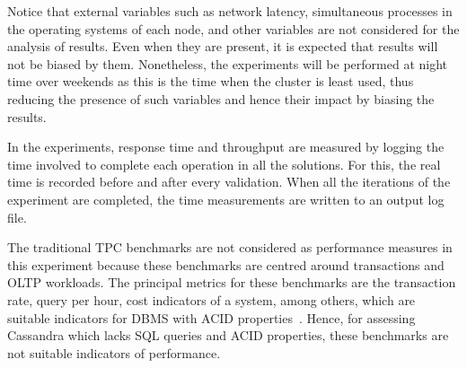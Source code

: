 Notice that external variables such as network latency,  simultaneous processes
in the operating systems of each node,  and other variables are not considered
for the analysis of results.  Even when they are present,  it is expected that
results will not be biased by them.  Nonetheless,  the experiments will be
performed at night time over weekends as this is the time when the cluster is
least used,  thus reducing the presence of such variables and hence their impact
by biasing the results. 

In the experiments,  response time and throughput are measured by logging the
time involved to complete each operation in all the solutions. 
For this,  the  real time is recorded before and after every validation.  When all
the iterations of the experiment are completed,  the time
measurements are written to an output log file. 

The traditional TPC benchmarks are not considered as performance measures in
this experiment  because these benchmarks are centred around transactions and
OLTP workloads.  The principal metrics for these benchmarks are the transaction
rate,  query per hour,  cost indicators of a system,  among others,  which are
suitable indicators for \ac{DBMS} with ACID properties~\citep{TPC}.  Hence,  for
assessing Cassandra which lacks SQL queries and  ACID properties,  these
benchmarks are not suitable indicators of performance. 








